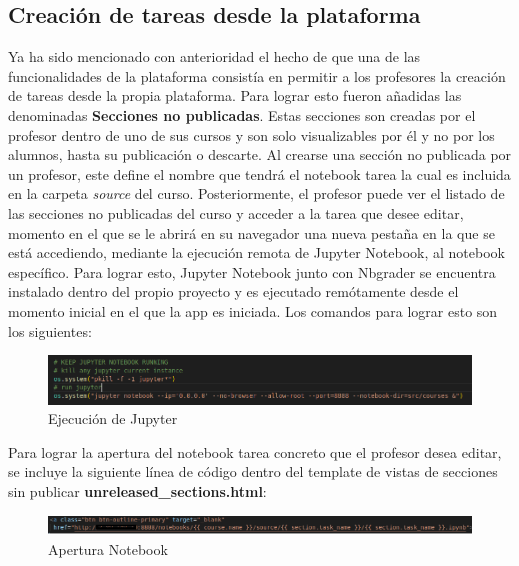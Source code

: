 \subsection{Creación de tareas desde la plataforma}

Ya ha sido mencionado con anterioridad el hecho de que una de las funcionalidades de la plataforma consistía en permitir a los profesores la creación de tareas desde la propia plataforma. Para lograr esto fueron añadidas las denominadas \textbf{Secciones no publicadas}. Estas secciones son creadas por el profesor dentro de uno de sus cursos y son solo visualizables por él y no por los alumnos, hasta su publicación o descarte. Al crearse una sección no publicada por un profesor, este define el nombre que tendrá el notebook tarea la cual es incluida en la carpeta \textit{source} del curso. Posteriormente, el profesor puede ver el listado de las secciones no publicadas del curso y acceder a la tarea que desee editar, momento en el que se le abrirá en su navegador una nueva pestaña en la que se está accediendo, mediante la ejecución remota de Jupyter Notebook, al notebook específico. Para lograr esto, Jupyter Notebook junto con Nbgrader se encuentra instalado dentro del propio proyecto y es ejecutado remótamente desde el momento inicial en el que la app es iniciada. Los comandos para lograr esto son los siguientes:

\begin{figure}[H]
    \centering
    \includegraphics[scale=0.8]{img/imgs-memoria/RunJupyter.PNG}
    \caption{Ejecución de Jupyter}
\end{figure}

Para lograr la apertura del notebook tarea concreto que el profesor desea editar, se incluye la siguiente línea de código dentro del template de vistas de secciones sin publicar \textbf{unreleased\_sections.html}: 

\begin{figure}[H]
    \hspace*{-1.5cm} 
    \includegraphics[scale=0.8]{img/imgs-memoria/AbrirNotebook.PNG}
    \caption{Apertura Notebook}
\end{figure}

